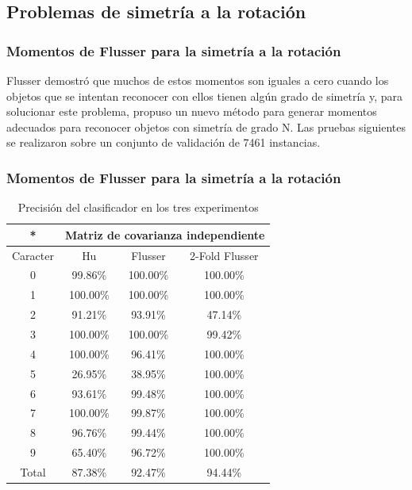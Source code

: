 \documentclass{beamer}
\begin{document}
	\subsection{Problemas de simetría a la rotación}
	
	\begin{frame}
	\frametitle{Momentos de Flusser para la simetría a la rotación}
	Flusser demostró que muchos de estos momentos son iguales a cero cuando los objetos que se intentan reconocer con ellos tienen algún grado de simetría y, para solucionar este problema, propuso un nuevo método para generar momentos adecuados para reconocer objetos con simetría de grado N.
	\newline \newline
	Las pruebas siguientes se realizaron sobre un conjunto de validación de 7461 instancias.
	\end{frame}
	
	\begin{frame}
	\frametitle{Momentos de Flusser para la simetría a la rotación}
	\begin{table}
	\begin{center}
	\begin{tabular}{|c|c|c|c|}
		\hline
		* & \multicolumn{3}{|c|}{Matriz de covarianza independiente} \\
		\hline
		Caracter & Hu & Flusser & 2-Fold Flusser\\
		\hline
		0 & 99.86\% & 100.00\% & 100.00\%\\
		1 &	100.00\% & 100.00\% & 100.00\% \\
		2 &	91.21\% & 93.91\% & 47.14\% \\
		3 &	100.00\% & 100.00\% & 99.42\% \\
		4 &	100.00\% & 96.41\% & 100.00\% \\		
		5 & 26.95\% & 38.95\% & 100.00\% \\ 
		6 & 93.61\% & 99.48\% & 100.00\% \\
		7 & 100.00\% & 99.87\% & 100.00\% \\
		8 & 96.76\% & 99.44\% & 100.00\% \\
		9 &	65.40\% & 96.72\% & 100.00\% \\
		\hline
		Total & 87.38\% & 92.47\% & 94.44\% \\
		\hline
	\end{tabular}
	\end{center}
	\caption{Precisión del clasificador en los tres experimentos}	
	\label{tb:exp4_1}
	\end{table}
	\end{frame}
	
\end{document}
